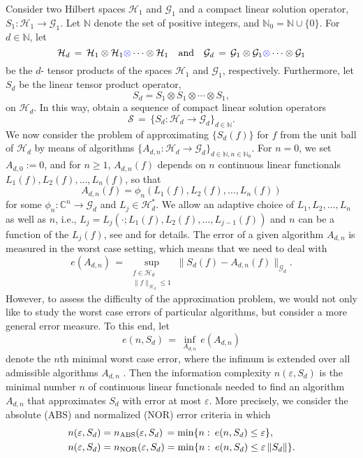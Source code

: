 \documentclass[graybox]{svmult}
\newcommand{\NOR}{\textup{NOR}\xspace}
\newcommand{\ABS}{\textup{ABS}\xspace}
\newcommand{\calG}{{\mathcal{G}}}
\newcommand{\calH}{{\mathcal{H}}}
\newcommand{\calS}{{\mathcal{S}}}
\newcommand{\C}{{\mathbb{C}}} %
\newcommand{\N}{{\mathbb{N}}} %
\newcommand{\R}{{\mathbb{R}}} %
\newcommand{\pk}[1]{{\color{blue}{#1}}}
\begin{document}
\bigskip

Consider two Hilbert spaces $\calH_1$ and $\calG_1$ and a 
compact linear solution operator,
$
S_1: \calH_1 \to \calG_1.
$
Let $\N$ denote the set of positive integers,   
and $\N_0 =\N\cup\{0\}$.  For $d\in \N$, let 
$$
\calH_d\,=\,\calH_1\otimes\calH_1\pk{\otimes}\cdots\otimes\calH_1\quad\mbox{and}\quad
\calG_d\,=\,\calG_1\otimes\calG_1\pk{\otimes}\cdots\otimes\calG_1
$$
be the $d$-\pk{fold} tensor products of the spaces $\calH_1$ and $\calG_1$, respectively. 
Furthermore, let $S_d$ be the linear tensor product operator,
$$ 
S_d=S_1\otimes S_1\otimes \cdots \otimes S_1,
$$
on $\calH_d$. 
In this way, obtain a sequence of compact    
linear solution operators    
$$   
\calS\,=\, \{S_d: \calH_d \to \calG_d\}_{d \in \N}.     
$$   
We now consider the problem of 
approximating $\{S_d(f)\}$ for $f$ from the   
unit ball of $\calH_d$ by means of algorithms   
$\{A_{d,n}: \calH_d \to \calG_d\}_{d \in \N,n\in\N_0}$.    
For $n=0$, we set $A_{d,0}:=0$, and for $n\ge 1$, $A_{d,n}(f)$    
depends on $n$ continuous    
linear functionals $L_1(f), L_2(f),\ldots, L_n(f)$, so that   
\begin{equation}\label{eq:algorithm} 
A_{d,n}(f)=\phi_n(L_1(f),L_2(f),\dots,L_n(f))   
\end{equation}   
for some $\phi_n:\C^n\to \calG_d$ \pk{or $\phi_n:\R^n\to \calG_d$} 
and $L_j\in \calH_d^*$.
We allow an adaptive choice of $L_1,L_2,\ldots,L_n$ as well as $n$, i.e.,   
$L_j=L_j(\cdot;L_1(f),L_2(f),\dots,L_{j-1}(f))$ and $n$ can be a   
function of the $L_j(f)$,    
see \cite{TWW88} and \cite{NW08} for details.
The error of a given algorithm $A_{d,n}$ is measured in the worst case setting, 
which means that we need to deal with  
$$   
e(A_{d,n})\,=\,\sup_{\substack{f\in\calH_d \\ \|f\|_{\calH_d}\le1}}   
\|S_d(f)-A_{d,n}(f)\|_{\calG_d}.   
$$   
However, to assess the difficulty of the approximation problem, we would not 
only like to study the worst case errors of particular algorithms, but 
consider a more general error measure. To this end, let   
$$   
e(n,S_d)\,=\,\inf_{A_{d,n}}\,e(A_{d,n})   
$$   
denote the $n$th minimal worst case error,    
where the infimum is extended over all admissible algorithms $A_{d,n}$ \pk{of the form \eqref{eq:algorithm}}. Then    
the information complexity $n(\varepsilon,S_d)$ is   
the minimal number $n$ of continuous linear functionals    
needed to find an algorithm $A_{d,n}$ that approximates   
$S_d$ with error at most $\varepsilon$. More precisely,    
we consider the absolute (\ABS) and normalized (\NOR) error criteria   
in which    
\begin{align*}   
 n(\varepsilon,S_d)&=n_{\ABS}(\varepsilon, S_d)\, =   
\min\{n\,\colon\,e(n,S_d)\le \varepsilon\},\\   
 n(\varepsilon,S_d)&=n_{\NOR}(\varepsilon,S_d)=   
\min\{n\,\colon\,e(n,S_d) \le \varepsilon\,\|S_d\|\}.   
\end{align*}   
\end{document}
